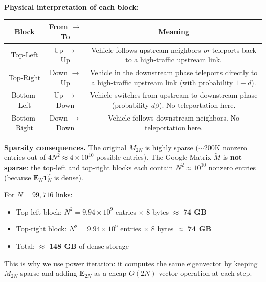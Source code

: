 \documentclass[11pt,a4paper]{article}
\theoremstyle{definition}
\begin{document}
\medskip
\noindent\textbf{Physical interpretation of each block:}

\begin{center}
\renewcommand{\arraystretch}{1.4}
\begin{tabular}{|c|c|c|}
\hline
\textbf{Block} & \textbf{From $\to$ To} & \textbf{Meaning} \\
\hline
Top-Left & Up $\to$ Up &
\begin{minipage}{6.5cm}\small
  Vehicle follows upstream neighbors \emph{or} teleports
  back to a high-traffic upstream link.
\end{minipage} \\
\hline
Top-Right & Down $\to$ Up &
\begin{minipage}{6.5cm}\small
  Vehicle in the downstream phase teleports directly
  to a high-traffic upstream link (with probability $1-d$).
\end{minipage} \\
\hline
Bottom-Left & Up $\to$ Down &
\begin{minipage}{6.5cm}\small
  Vehicle switches from upstream to downstream phase
  (probability $d\beta$). No teleportation here.
\end{minipage} \\
\hline
Bottom-Right & Down $\to$ Down &
\begin{minipage}{6.5cm}\small
  Vehicle follows downstream neighbors.
  No teleportation here.
\end{minipage} \\
\hline
\end{tabular}
\end{center}

\medskip
\noindent\textbf{Sparsity consequences.}
The original $M_{2N}$ is highly sparse ($\sim$200K nonzero entries out of
$4N^2 \approx 4 \times 10^{10}$ possible entries).  The Google Matrix
$\widetilde{M}$ is \textbf{not sparse}: the top-left and top-right blocks
each contain $N^2 \approx 10^{10}$ nonzero entries (because
$\bm{E}_N\bm{1}_N^T$ is dense).

\begin{tcolorbox}[colback=red!5,colframe=accent,title=Why We Cannot Store $\widetilde{M}$]
For $N = 99{,}716$ links:
\begin{itemize}
  \item Top-left block: $N^2 = 9.94 \times 10^9$ entries $\times$ 8 bytes $\approx$ \textbf{74 GB}
  \item Top-right block: $N^2 = 9.94 \times 10^9$ entries $\times$ 8 bytes $\approx$ \textbf{74 GB}
  \item Total: $\approx$ \textbf{148 GB} of dense storage
\end{itemize}
This is why we use power iteration: it computes the same eigenvector by
keeping $M_{2N}$ sparse and adding $\bm{E}_{2N}$ as a cheap $O(2N)$ vector
operation at each step.
\end{tcolorbox}
\end{document}
